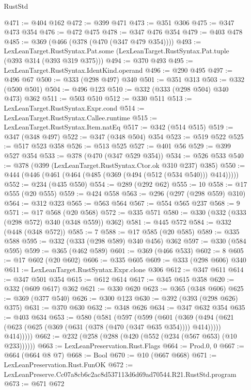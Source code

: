 \begin{lexlean}{RustStd}
\begin{coremodule}
@471 := @404 @162
@472 := @399 @471
@473 := @351 @306
@475 := @347 @473 @354
@476 := @472 @475
@478 := @347 @476 @354
@479 := @403 @478
@485 := @369 (@466 (@378 (@470 (@347 @479 @354))))
@493 := LexLeanTarget.RustSyntax.Pat.some
    (LexLeanTarget.RustSyntax.Pat.tuple (@393 @314 (@393 @319 @375)))
@494 := @370 @493
@495 := LexLeanTarget.RustSyntax.IdentKind.operand
@496 := @290 @495
@497 := @496 @67
@500 := @333 (@298 @497) @340
@501 := @351 @313
@503 := @332 (@500 @501)
@504 := @496 @123
@510 := @332 (@333 (@298 @504) @340 @473) @362
@511 := @503 @510
@512 := @330 @511
@513 := LexLeanTarget.RustSyntax.Expr.cond
@514 := LexLeanTarget.RustSyntax.Callee.runtime
@515 := LexLeanTarget.RustSyntax.Item.natEq
@517 := @342 (@514 @515)
@519 := @347 (@348 @497)
@522 := @347 (@348 @504) @354
@523 := @519 @522
@525 := @517 @523 @358
@526 := @513 @525
@527 := @401 @56
@529 := @399 @527 @354
@533 := @378 (@470 (@347 @529 @354))
@534 := @526 @533
@540 := @378 (@399 (LexLeanTarget.RustSyntax.Ctor.ok @310 @237) @385)
@550 := @444 (@446 (@461 (@464 (@485 (@369 (@494 (@512 (@534 @540))) @414)))))
@552 := @234 (@435 @550)
@554 := @289 (@292 @62)
@555 := 10
@558 := @17 @555 (@20 @555)
@559 := @424 @558
@563 := @296 (@297 (@298 @559) @310)
@564 := @312 @323
@565 := @563 @564
@567 := @554 @565 @237
@568 := 9
@571 := @17 @568 (@20 @568)
@572 := @335 @571
@580 := @330 (@332 (@333 (@298 @572) @340 (@348 @559)) @362)
@581 := @445 @572
@584 := @332 (@448 (@348 @572))
@585 := 7
@588 := @17 @585 (@20 @585)
@589 := @335 @588
@595 := @332 (@333 (@298 @589) @340 @456) @362
@597 := @330 (@584 @595)
@599 := @365 (@462 @589)
@601 := @369 (@466 @533)
@602 := 8
@605 := @17 @602 (@20 @602)
@606 := @335 @605
@609 := @333 (@298 @606) @340
@611 := LexLeanTarget.RustSyntax.Expr.clone @306
@612 := @347 @611
@614 := @347 @501 @354
@615 := @612 @614
@617 := @345 @615 @358
@620 := @332 (@609 @617) @362
@621 := @330 @620
@623 := @365 (@348 @606)
@625 := @369 (@377 @540)
@626 := @300 @123
@630 := @392 (@393 (@298 @626) @375)
@631 := @370 @630
@632 := @348 @626
@634 := @347 @632 @354
@635 := @403 @634
@653 := @580
    (@581
      (@597
        (@599
          (@601
            (@369
              (@494 (@621 (@623 (@625 (@369 (@631 (@378 (@470 (@347 @635 @354)))) @414)))))
              @414)))))
@662 := @232 (@258 (@288 (@420 (@552 (@234 (@567 @653) (@10 @233))))))
@663 := LexLeanPreservation.Rust.Flags
@664 := Prod.{0, 0}
@667 := @664 (@664 @8 @7)
@668 := Bool
@670 := @10 (@667 @668)
@671 := LexLeanPreservation.Rust.FunOK
@672 := LexLeanPreserve.Cc07a8cb6c2ac8d537113d6d69ad70544.R21.RustStd.program
@673 := @671 @672

\end{coremodule}
\end{lexlean}
